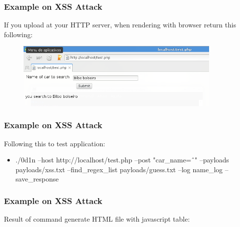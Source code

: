 \documentclass[serif,mathserif]{beamer}
\begin{document}
\begin{frame}
  \frametitle{Example on XSS Attack}
  If you upload at your HTTP server, when rendering with browser return this following:
  \begin{itemize}
  \begin{figure}[t]
    \centering
    \includegraphics[width=10cm]{images/test_php.png}
  \end{figure}
 \end{itemize}
\end{frame}


\begin{frame}
  \frametitle{Example on XSS Attack}
  Following this to test application:
  \begin{itemize}
  \item ./0d1n --host http://localhost/test.php --post "car\_name=\^ \ " --payloads payloads/xss.txt --find\_regex\_list payloads/guess.txt --log name\_log --save\_response 
 \end{itemize}
\end{frame}



\begin{frame}
  \frametitle{Example on XSS Attack}
  Result of command generate HTML file with javascript table:
  \begin{itemize}
  \begin{figure}[t]    
    \centering
  \end{figure}
 \end{itemize}
\end{frame}
\end{document}
